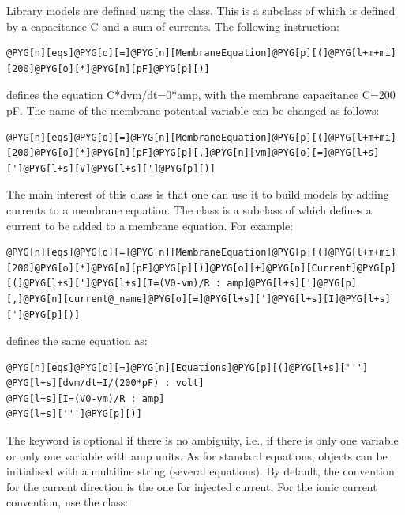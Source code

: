 \documentclass[letterpaper,10pt,english]{manual}
\begin{document}
Library models are defined using the  class. This is a subclass of
\hyperlink{brian.Equations}{} which is defined by a capacitance C and a sum of currents. The following instruction:

\begin{Verbatim}[commandchars=@\[\]]
@PYG[n][eqs]@PYG[o][=]@PYG[n][MembraneEquation]@PYG[p][(]@PYG[l+m+mi][200]@PYG[o][*]@PYG[n][pF]@PYG[p][)]
\end{Verbatim}

defines the equation C*dvm/dt=0*amp, with the membrane capacitance C=200 pF. The name of the membrane potential
variable can be changed as follows:

\begin{Verbatim}[commandchars=@\[\]]
@PYG[n][eqs]@PYG[o][=]@PYG[n][MembraneEquation]@PYG[p][(]@PYG[l+m+mi][200]@PYG[o][*]@PYG[n][pF]@PYG[p][,]@PYG[n][vm]@PYG[o][=]@PYG[l+s][']@PYG[l+s][V]@PYG[l+s][']@PYG[p][)]
\end{Verbatim}

The main interest of this class is that one can use it to build models by adding currents to a membrane
equation. The  class is a subclass of \hyperlink{brian.Equations}{} which defines a current to be added
to a membrane equation. For example:

\begin{Verbatim}[commandchars=@\[\]]
@PYG[n][eqs]@PYG[o][=]@PYG[n][MembraneEquation]@PYG[p][(]@PYG[l+m+mi][200]@PYG[o][*]@PYG[n][pF]@PYG[p][)]@PYG[o][+]@PYG[n][Current]@PYG[p][(]@PYG[l+s][']@PYG[l+s][I=(V0-vm)/R : amp]@PYG[l+s][']@PYG[p][,]@PYG[n][current@_name]@PYG[o][=]@PYG[l+s][']@PYG[l+s][I]@PYG[l+s][']@PYG[p][)]
\end{Verbatim}

defines the same equation as:

\begin{Verbatim}[commandchars=@\[\]]
@PYG[n][eqs]@PYG[o][=]@PYG[n][Equations]@PYG[p][(]@PYG[l+s][''']
@PYG[l+s][dvm/dt=I/(200*pF) : volt]
@PYG[l+s][I=(V0-vm)/R : amp]
@PYG[l+s][''']@PYG[p][)]
\end{Verbatim}

The keyword  is optional if there is no ambiguity, i.e., if there is only one variable
or only one variable with amp units. As for standard equations,  objects can be initialised with
a multiline string (several equations). By default, the convention for the current direction is the one for injected
current. For the ionic current convention, use the  class:
\end{document}

